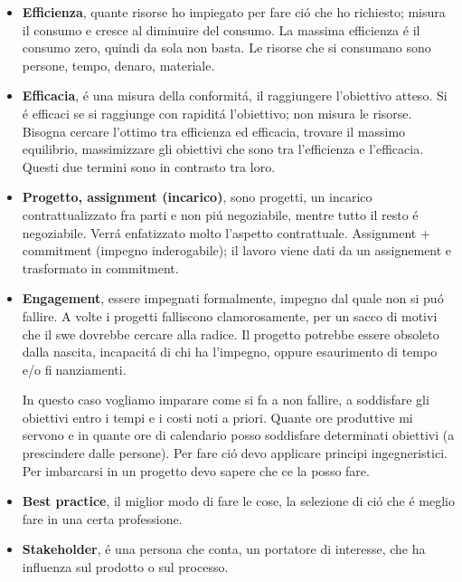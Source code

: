 \documentclass[10pt]{article}
\begin{document}
\begin{itemize}
\begin{itemize}
\item \textbf{NOTA: il software muore quando non c\'e pi\'u nessuna manutenzione
da
nessun developer o da nessuna comunit\'a - utenza.}
	\end{itemize}

\item \textbf{Efficienza}, quante risorse ho impiegato per fare ci\'o che ho
richiesto; misura il consumo e cresce al diminuire
del consumo. La massima efficienza \'e il consumo zero, quindi da sola non basta.
Le risorse che si consumano
sono persone, tempo, denaro, materiale.

\item \textbf{Efficacia}, \'e una misura della conformit\'a, il raggiungere
l'obiettivo atteso. Si \'e efficaci se si raggiunge con
rapidit\'a l'obiettivo; non misura le risorse. Bisogna cercare l'ottimo tra
efficienza ed efficacia, trovare il massimo equilibrio, massimizzare gli obiettivi
che sono tra l'efficienza e l'efficacia. Questi due termini sono in contrasto tra
loro.

\item\textbf{Progetto, assignment (incarico)}, sono progetti, un incarico
contrattualizzato fra parti
e non pi\'u negoziabile, mentre tutto il resto \'e negoziabile. Verr\'a
enfatizzato molto l'aspetto
contrattuale. Assignment + commitment (impegno inderogabile); il lavoro viene dati
da un assignement
e trasformato in commitment.

\item \textbf{Engagement}, essere impegnati formalmente, impegno dal quale non si
pu\'o fallire. A volte i progetti
falliscono clamorosamente, per un sacco di motivi che il swe dovrebbe cercare alla
radice. Il progetto
potrebbe essere obsoleto dalla nascita, incapacit\'a di chi ha l'impegno, oppure
esaurimento di tempo
e/o finanziamenti.

In questo caso vogliamo imparare come si fa a non fallire, a soddisfare gli
obiettivi entro i tempi e i costi
noti a priori. Quante ore produttive mi servono e in quante ore di calendario
posso soddisfare determinati
obiettivi (a prescindere dalle persone). Per fare ci\'o devo applicare principi
ingegneristici. Per imbarcarsi in
un progetto devo sapere che ce la posso fare.

\item \textbf{Best practice}, il miglior modo di fare le cose, la selezione di
ci\'o che \'e meglio fare in una certa professione.

\item \textbf{Stakeholder}, \'e una persona che conta, un portatore di interesse,
che ha influenza sul prodotto o sul processo.


\end{itemize}
\end{document}
